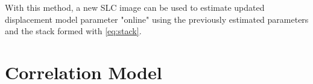 \documentclass{article}
\begin{document}
With this method, a new SLC image can be used to estimate updated displacement model parameter "online" using the previously estimated parameters and the stack formed with \autoref{eq:stack}.
\section{Correlation Model}


\end{document}
